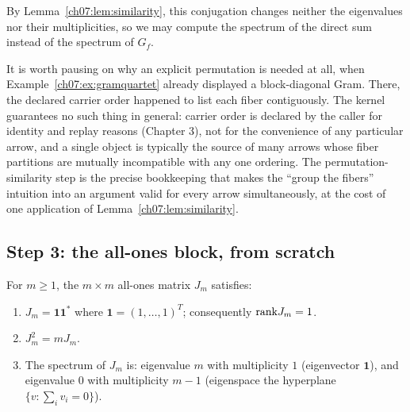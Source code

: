 By Lemma~\ref{ch07:lem:similarity}, this conjugation changes neither the
eigenvalues nor their multiplicities, so we may compute the spectrum of the
direct sum instead of the spectrum of $G_f$.

It is worth pausing on why an explicit permutation is needed at all, when
Example~\ref{ch07:ex:gramquartet} already displayed a block-diagonal Gram.
There, the declared carrier order happened to list each fiber contiguously.
The kernel guarantees no such thing in general: carrier order is declared by
the caller for identity and replay reasons (Chapter 3), not
for the convenience of any particular arrow, and a single object is typically
the source of many arrows whose fiber partitions are mutually incompatible
with any one ordering. The permutation-similarity step is the precise
bookkeeping that makes the ``group the fibers'' intuition into an argument
valid for every arrow simultaneously, at the cost of one application of
Lemma~\ref{ch07:lem:similarity}.

\subsection{Step 3: the all-ones block, from scratch}

\begin{lemma}\label{ch07:lem:allones}
For $m\ge 1$, the $m\times m$ all-ones matrix $J_m$ satisfies:
\begin{enumerate}
\item $J_m=\mathbf{1}\mathbf{1}^{*}$ where $\mathbf{1}=(1,\dots,1)^{T}$;
  consequently $\mathrm{rank} J_m=1$.
\item $J_m^2=mJ_m$.
\item The spectrum of $J_m$ is: eigenvalue $m$ with multiplicity $1$
  (eigenvector $\mathbf{1}$), and eigenvalue $0$ with multiplicity $m-1$
  (eigenspace the hyperplane $\{v:\sum_i v_i=0\}$).
\end{enumerate}
\end{lemma}

